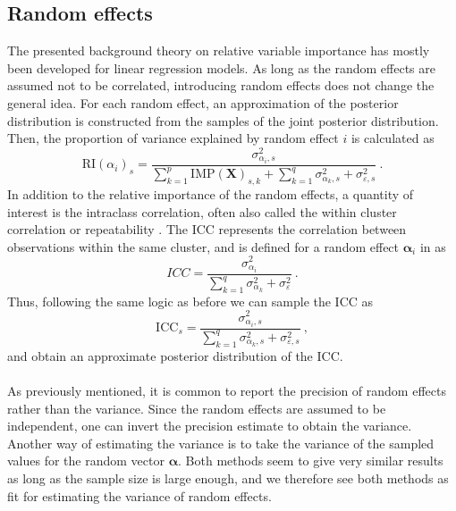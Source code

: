 \subsection{Random effects}
The presented background theory on relative variable importance has mostly been developed for linear regression models. As long as the random effects are assumed not to be correlated, introducing random effects does not change the general idea. For each random effect, an approximation of the posterior distribution is constructed from the samples of the joint posterior distribution. Then, the proportion of variance explained by random effect $i$ is calculated as 
\begin{equation}
    \label{eq:RI_alpha}
    \text{RI}(\alpha_i)_{s} = \frac{\sigma_{\alpha_i, s}^2}{\sum_{k=1}^{p}\text{IMP}(\mathbf{X})_{s, k} + \sum_{k=1}^q \sigma_{\alpha_k, s}^2 + \sigma_{\varepsilon, s}^2} \ .
\end{equation}
In addition to the relative importance of the random effects, a quantity of interest is the intraclass correlation, often also called the within cluster correlation or repeatability \citep{GLMM_book}. The ICC represents the correlation between observations within the same cluster, and is defined for a random effect $\boldsymbol{\alpha}_i$ in \citep{nakagawa2017} as
\begin{equation}
    ICC = \frac{\sigma_{\alpha_i}^2}{\sum_{k=1}^{q}\sigma_{\alpha_k}^2 + \sigma_{\varepsilon}^2} \ .
\end{equation}
Thus, following the same logic as before we can sample the ICC as 
\begin{equation}
    \text{ICC}_s = \frac{\sigma_{\alpha_i, s}^2}{\sum_{k=1}^{q}\sigma_{\alpha_k, s}^2 + \sigma_{\varepsilon, s}^2} \ ,
\end{equation}
and obtain an approximate posterior distribution of the ICC.
\\
\\
As previously mentioned, it is common to report the precision of random effects rather than the variance. Since the random effects are assumed to be independent, one can invert the precision estimate to obtain the variance. Another way of estimating the variance is to take the variance of the sampled values for the random vector $\boldsymbol{\alpha}$. Both methods seem to give very similar results as long as the sample size is large enough, and we therefore see both methods as fit for estimating the variance of random effects.

